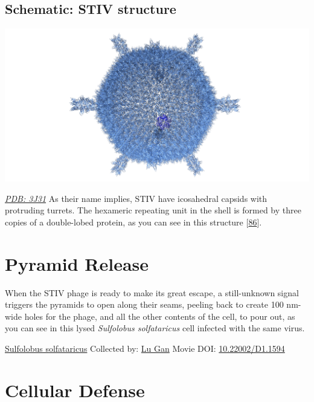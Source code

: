 \documentclass[]{tufte-book}
\begin{document}
\hypertarget{STIV_structure}{%
\subsection*{Schematic: STIV structure}\label{STIV_structure}}

\includegraphics{img/schematics/10_8_1}

\href{http://rcsb.org/structure/3J31}{\emph{PDB: 3J31}}
As their name implies, STIV have icosahedral capsids with protruding turrets. The hexameric repeating unit in the shell is formed by three copies of a double-lobed protein, as you can see in this structure {[}\protect\hyperlink{ref-veesler2013}{86}{]}.

\hypertarget{pyramid-release}{%
\section{Pyramid Release}\label{pyramid-release}}

When the STIV phage is ready to make its great escape, a still-unknown signal triggers the pyramids to open along their seams, peeling back to create 100 nm-wide holes for the phage, and all the other contents of the cell, to pour out, as you can see in this lysed \emph{Sulfolobus solfataricus} cell infected with the same virus.



\hypertarget{htmlwidget-998b069cd8ab3d5fe9d7}{}

\label{fig:10-9}\protect\hyperlink{tree}{Sulfolobus solfataricus} Collected by: \protect\hyperlink{lu_gan}{Lu Gan} Movie DOI: \href{https://doi.org/10.22002/D1.1594}{10.22002/D1.1594}

\hypertarget{cellular-defense}{%
\section{Cellular Defense}\label{cellular-defense}}
\end{document}
